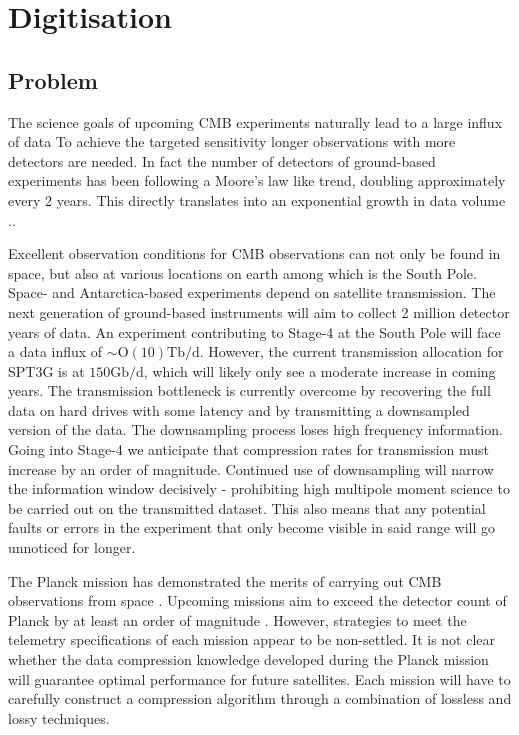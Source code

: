 \documentclass[apj]{emulateapj}
\begin{document}
\section{Digitisation}
\label{sec:dig}

\subsection{Problem}
\label{subsec:problem}


The science goals of upcoming CMB experiments naturally lead to a large influx of data To achieve the targeted sensitivity longer observations with more detectors are needed. In fact the number of detectors of ground-based experiments has been following a Moore's law like trend, doubling approximately every 2 years. This directly translates into an exponential growth in data volume \citep{s4sciencebook}..

Excellent observation conditions for CMB observations can not only be found in space, but also at various locations on earth \citep{li2017, kovac2007} among which is the South Pole. Space- and Antarctica-based experiments depend on satellite transmission. The next generation of ground-based instruments will aim to collect 2 million detector years of data. An experiment contributing to Stage-4 at the South Pole will face a data influx of $\sim \mathrm{O}(10)\mathrm{Tb/d}$. However, the current transmission allocation for SPT3G is at $150\mathrm{Gb/d}$, which will likely only see a moderate increase in coming years. The transmission bottleneck is currently overcome by recovering the full data on hard drives with some latency and by transmitting a downsampled version of the data. The downsampling process loses high frequency information. Going into Stage-4 we anticipate that compression rates for transmission must increase by an order of magnitude. Continued use of downsampling will narrow the information window decisively - prohibiting high multipole moment science to be carried out on the transmitted dataset. This also means that any potential faults or errors in the experiment that only become visible in said range will go unnoticed for longer.

The Planck mission has demonstrated the merits of carrying out CMB observations from space \citep{planck2018}. Upcoming missions aim to exceed the detector count of Planck by at least an order of magnitude \citep{litebird2014, pixie2011, core2018}. However, strategies to meet the telemetry specifications of each mission appear to be non-settled. It is not clear whether the data compression knowledge developed during the Planck mission will guarantee optimal performance for future satellites. Each mission will have to carefully construct a compression algorithm through a combination of lossless and lossy techniques.
\end{document}
